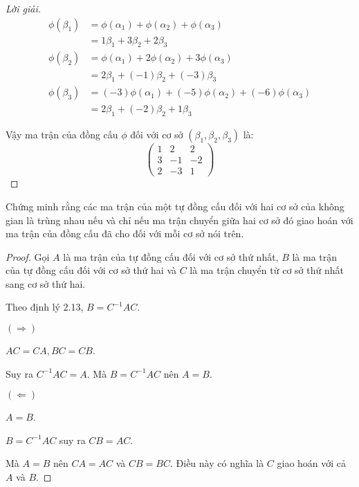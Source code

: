 \documentclass[class=nhvh-linear-algebra,crop=false]{standalone}
\begin{document}
\begin{proof}[Lời giải]
    \begin{align*}
        \phi(\beta_{1}) & = \phi(\alpha_{1}) + \phi(\alpha_{2}) + \phi(\alpha_{3})             \\
                        & = 1\beta_{1} + 3\beta_{2} + 2\beta_{3}                               \\
        \phi(\beta_{2}) & = \phi(\alpha_{1}) + 2\phi(\alpha_{2}) + 3\phi(\alpha_{3})           \\
                        & = 2\beta_{1} + (-1)\beta_{2} + (-3)\beta_{3}                         \\
        \phi(\beta_{3}) & = (-3)\phi(\alpha_{1}) + (-5)\phi(\alpha_{2}) + (-6)\phi(\alpha_{3}) \\
                        & = 2\beta_{1} + (-2)\beta_{2} + 1\beta_{3}
    \end{align*}
    \par Vậy ma trận của đồng cấu $\phi$ đối với cơ sở $(\beta_{1}, \beta_{2}, \beta_{3})$ là:
    \[
        \begin{pmatrix}
            1 & 2  & 2  \\
            3 & -1 & -2 \\
            2 & -3 & 1
        \end{pmatrix}
    \]
\end{proof}

\begin{exercise}
    Chứng minh rằng các ma trận của một tự đồng cấu đối với hai cơ sở của không gian là trùng nhau nếu và chỉ nếu ma trận chuyển giữa hai cơ sở đó giao hoán với ma trận của đồng cấu đã cho đối với mỗi cơ sở nói trên.
\end{exercise}

\begin{proof}
    Gọi $A$ là ma trận của tự đồng cấu đối với cơ sở thứ nhất, $B$ là ma trận của tự đồng cấu đối với cơ sở thứ hai và $C$ là ma trận chuyển từ cơ sở thứ nhất sang cơ sở thứ hai.
    \par Theo định lý 2.13, $B = C^{-1}AC$.
    \par $(\Rightarrow)$
    \par $AC = CA, BC = CB$.
    \par Suy ra $C^{-1}AC = A$. Mà $B = C^{-1}AC$ nên $A = B$.
    \par $(\Leftarrow)$
    \par $A = B$.
    \par $B = C^{-1}AC$ suy ra $CB = AC$.
    \par Mà $A = B$ nên $CA = AC$ và $CB = BC$. Điều này có nghĩa là $C$ giao hoán với cả $A$ và $B$.
\end{proof}
\end{document}

